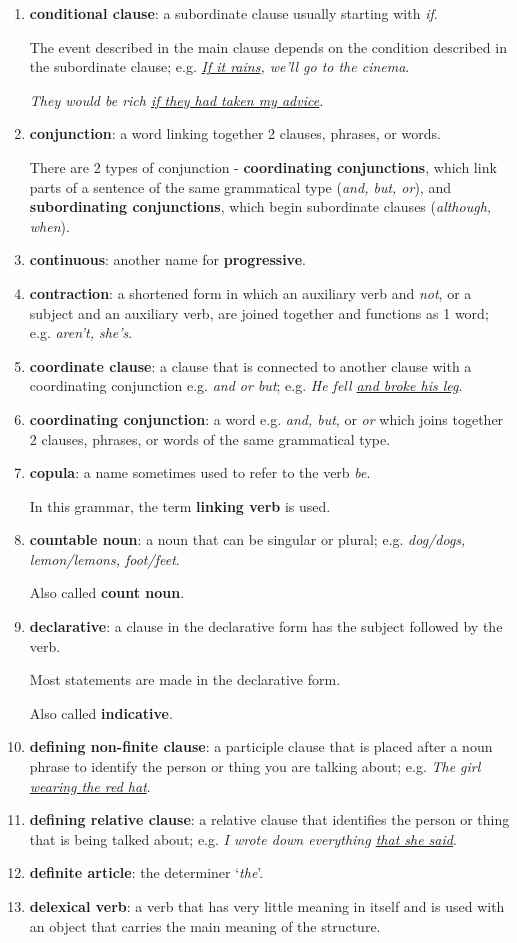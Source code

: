 \documentclass[oneside]{book}
\numberwithin{equation}{section}
\begin{document}
\begin{enumerate}
    Cf. \textbf{abstract noun}.
    \item \textbf{conditional clause}: a subordinate clause usually starting with \textit{if}.
    
    The event described in the main clause depends on the condition described in the subordinate clause; e.g. \textit{\underline{If it rains}, we'll go to the cinema}.
        
    \textit{They would be rich \underline{if they had taken my advice}}.
    \item \textbf{conjunction}: a word linking together 2 clauses, phrases, or words.
    
    There are 2 types of conjunction - \textbf{coordinating conjunctions}, which link parts of a sentence of the same grammatical type (\textit{and, but, or}), and \textbf{subordinating conjunctions}, which begin subordinate clauses (\textit{although, when}).
    \item \textbf{continuous}: another name for \textbf{progressive}.
    \item \textbf{contraction}: a shortened form in which an auxiliary verb and \textit{not}, or a subject and an auxiliary verb, are joined together and functions as 1 word; e.g. \textit{aren't, she's}.
    \item \textbf{coordinate clause}: a clause that is connected to another clause with a coordinating conjunction e.g. \textit{and or but}; e.g. \textit{He fell \underline{and broke his leg}}.
    \item \textbf{coordinating conjunction}: a word e.g. \textit{and, but}, or \textit{or} which joins together 2 clauses, phrases, or words of the same grammatical type.
    \item \textbf{copula}: a name sometimes used to refer to the verb \textit{be}.
    
    In this grammar, the term \textbf{linking verb} is used.
    \item \textbf{countable noun}: a noun that can be singular or plural; e.g. \textit{dog/dogs, lemon/lemons, foot/feet}.
    
    Also called \textbf{count noun}.
    \item \textbf{declarative}: a clause in the declarative form has the subject followed by the verb.
    
    Most statements are made in the declarative form.
    
    Also called \textbf{indicative}.
    \item \textbf{defining non-finite clause}: a participle clause that is placed after a noun phrase to identify the person or thing you are talking about; e.g. \textit{The girl \underline{wearing the red hat}}.
    \item \textbf{defining relative clause}: a relative clause that identifies the person or thing that is being talked about; e.g. \textit{I wrote down everything \underline{that she said}}.
    \item \textbf{definite article}: the determiner `\textit{the}'.
    \item \textbf{delexical verb}: a verb that has very little meaning in itself and is used with an object that carries the main meaning of the structure.
    

\end{enumerate}
\end{document}
